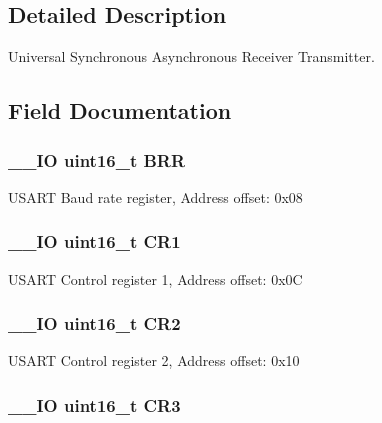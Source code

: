 \subsection{Detailed Description}
Universal Synchronous Asynchronous Receiver Transmitter. 

\subsection{Field Documentation}
\hypertarget{struct_u_s_a_r_t___type_def_af0ba3d82d524fddbe0fb3309788e2954}{
\subsubsection[{B\-R\-R}]{\setlength{\rightskip}{0pt plus 5cm}\-\_\-\-\_\-\-I\-O uint16\-\_\-t B\-R\-R}}\label{struct_u_s_a_r_t___type_def_af0ba3d82d524fddbe0fb3309788e2954}
U\-S\-A\-R\-T Baud rate register, Address offset\-: 0x08 \hypertarget{struct_u_s_a_r_t___type_def_a61400ce239355b62aa25c95fcc18a5e1}{
\subsubsection[{C\-R1}]{\setlength{\rightskip}{0pt plus 5cm}\-\_\-\-\_\-\-I\-O uint16\-\_\-t C\-R1}}\label{struct_u_s_a_r_t___type_def_a61400ce239355b62aa25c95fcc18a5e1}
U\-S\-A\-R\-T Control register 1, Address offset\-: 0x0\-C \hypertarget{struct_u_s_a_r_t___type_def_a2a3e81bd118d1bc52d24a0b0772e6a0c}{
\subsubsection[{C\-R2}]{\setlength{\rightskip}{0pt plus 5cm}\-\_\-\-\_\-\-I\-O uint16\-\_\-t C\-R2}}\label{struct_u_s_a_r_t___type_def_a2a3e81bd118d1bc52d24a0b0772e6a0c}
U\-S\-A\-R\-T Control register 2, Address offset\-: 0x10 \hypertarget{struct_u_s_a_r_t___type_def_a9651ce2df8eec57b9cab2f27f6dbf3e1}{
\subsubsection[{C\-R3}]{\setlength{\rightskip}{0pt plus 5cm}\-\_\-\-\_\-\-I\-O uint16\-\_\-t C\-R3}}\label{struct_u_s_a_r_t___type_def_a9651ce2df8eec57b9cab2f27f6dbf3e1}
